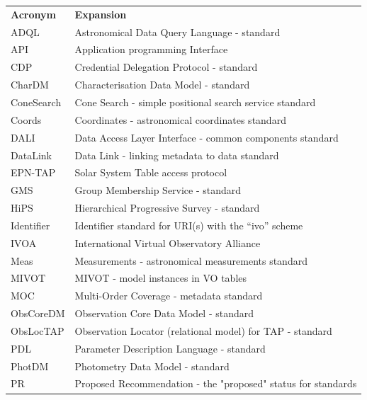 \documentclass[11pt,letter]{ivoa}
\begin{document}
{\begin{longtable}[t]{l l}
        \sptablerule
        \textbf{Acronym} & \textbf{Expansion} \\
        \sptablerule
        {ADQL} & 
        {Astronomical Data Query Language - standard} \\
        {API} & 
        {Application programming Interface} \\
        {CDP} &
        {Credential Delegation Protocol - standard} \\
        {CharDM} &
        {Characterisation Data Model - standard} \\
        {ConeSearch} &
        {Cone Search - simple positional search service standard} \\
        {Coords} &
        {Coordinates - astronomical coordinates standard} \\
        {DALI} &
        {Data Access Layer Interface - common components standard} \\
        {DataLink} &
        {Data Link - linking metadata to data standard} \\
       {EPN-TAP} &
       {Solar System Table access protocol} \\
        {GMS} &
        {Group Membership Service - standard} \\
        {HiPS} &
        {Hierarchical Progressive Survey - standard} \\
        {Identifier} &
        {Identifier standard for URI(s) with the ``ivo'' scheme} \\
        {IVOA} &
        {International Virtual Observatory Alliance} \\
        {Meas} &
        {Measurements - astronomical measurements standard} \\
        {MIVOT} &
        {MIVOT - model instances in VO tables} \\
        {MOC} &
        {Multi-Order Coverage - metadata standard} \\
        {ObsCoreDM} &
        {Observation Core Data Model - standard} \\
        {ObsLocTAP}  &
        {Observation Locator (relational model) for TAP - standard} \\
        {PDL} &
        {Parameter Description Language - standard} \\
        {PhotDM} &
        {Photometry Data Model - standard} \\
        {PR} &
        {Proposed Recommendation - the "proposed" status for standards} \\

\end{longtable}}
\end{document}
